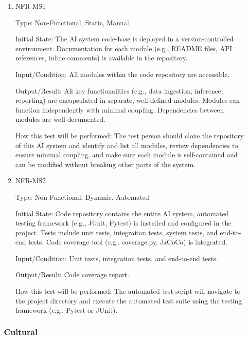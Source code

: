 \documentclass[12pt, titlepage]{article}
\begin{document}
\begin{enumerate}

\item{NFR-MS1\\}\label{NFR-MS1}

Type: Non-Functional, Static, Manual

Initial State: The AI system code-base is deployed in a version-controlled environment. Documentation for each module (e.g., README files, API references, inline comments) is available in the repository.

Input/Condition: All modules within the code repository are accessible.

Output/Result: All key functionalities (e.g., data ingestion, inference, reporting) are encapsulated in separate, well-defined modules. Modules can function independently with minimal coupling. Dependencies between modules are well-documented.

How this test will be performed: The test person should clone the repository of this AI system and identify and list all modules, review dependencies to ensure minimal coupling, and make sure each module is self-contained and can be modified without breaking other parts of the system.

\item{NFR-MS2\\}\label{NFR-MS2}

Type: Non-Functional, Dynamic, Automated

Initial State: Code repository contains the entire AI system, automated testing framework (e.g., JUnit, Pytest) is installed and configured in the project. Tests include unit tests, integration tests, system tests, and end-to-end tests. Code coverage tool (e.g., coverage.py, JaCoCo) is integrated.

Input/Condition: Unit tests, integration tests, and end-to-end tests.

Output/Result: Code coverage report.

How this test will be performed: The automated test script will navigate to the project directory and execute the automated test suite using the testing framework (e.g., Pytest or JUnit).

\end{enumerate}

\subsubsection{\sout{Cultural}}
\end{document}
